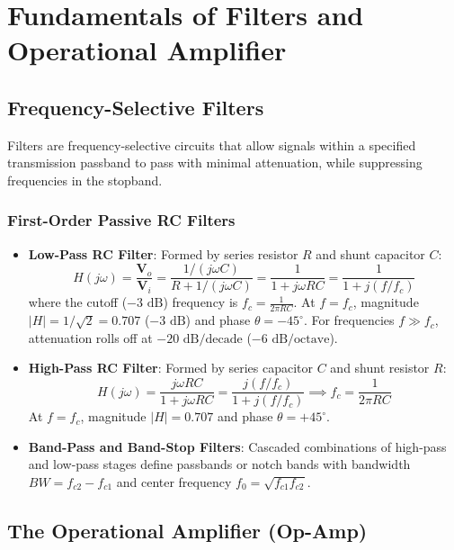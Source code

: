 \chapter{Fundamentals of Filters and Operational Amplifier}
\label{chap:filters-opamps}

\section{Frequency-Selective Filters}
Filters are frequency-selective circuits that allow signals within a specified transmission passband to pass with minimal attenuation, while suppressing frequencies in the stopband.

\subsection{First-Order Passive RC Filters}
\begin{itemize}[leftmargin=1.5em]
    \item \textbf{Low-Pass RC Filter}: Formed by series resistor $R$ and shunt capacitor $C$:
    \begin{equation}
    H(j\omega) = \frac{\mathbf{V}_o}{\mathbf{V}_i} = \frac{1/(j\omega C)}{R + 1/(j\omega C)} = \frac{1}{1 + j\omega RC} = \frac{1}{1 + j(f / f_c)}
    \end{equation}
    where the cutoff ($-3\text{ dB}$) frequency is $f_c = \frac{1}{2\pi RC}$. At $f = f_c$, magnitude $|H| = 1/\sqrt{2} = 0.707$ ($-3\text{ dB}$) and phase $\theta = -45^\circ$. For frequencies $f \gg f_c$, attenuation rolls off at $-20\text{ dB/decade}$ ($-6\text{ dB/octave}$).
    \item \textbf{High-Pass RC Filter}: Formed by series capacitor $C$ and shunt resistor $R$:
    \begin{equation}
    H(j\omega) = \frac{j\omega RC}{1 + j\omega RC} = \frac{j(f / f_c)}{1 + j(f / f_c)} \implies f_c = \frac{1}{2\pi RC}
    \end{equation}
    At $f = f_c$, magnitude $|H| = 0.707$ and phase $\theta = +45^\circ$.
    \item \textbf{Band-Pass and Band-Stop Filters}: Cascaded combinations of high-pass and low-pass stages define passbands or notch bands with bandwidth $BW = f_{c2} - f_{c1}$ and center frequency $f_0 = \sqrt{f_{c1} f_{c2}}$.
\end{itemize}

\section{The Operational Amplifier (Op-Amp)}

